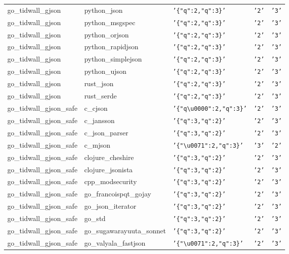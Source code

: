 \documentclass[english, 12pt, a4paper, sci, utf8, a-2b, online]{aaltothesis}
\def\str#1{\texttt{'#1'}}
\begin{document}
\begin{longtable}{lllll}
    go\_tidwall\_gjson & python\_json & \str{\{"q":2,"q":3\}} & \str{2} & \str{3} \\
    go\_tidwall\_gjson & python\_msgspec & \str{\{"q":2,"q":3\}} & \str{2} & \str{3} \\
    go\_tidwall\_gjson & python\_orjson & \str{\{"q":2,"q":3\}} & \str{2} & \str{3} \\
    go\_tidwall\_gjson & python\_rapidjson & \str{\{"q":2,"q":3\}} & \str{2} & \str{3} \\
    go\_tidwall\_gjson & python\_simplejson & \str{\{"q":2,"q":3\}} & \str{2} & \str{3} \\
    go\_tidwall\_gjson & python\_ujson & \str{\{"q":2,"q":3\}} & \str{2} & \str{3} \\
    go\_tidwall\_gjson & rust\_json & \str{\{"q":2,"q":3\}} & \str{2} & \str{3} \\
    go\_tidwall\_gjson & rust\_serde & \str{\{"q":2,"q":3\}} & \str{2} & \str{3} \\
    go\_tidwall\_gjson\_safe & c\_cjson & \str{\{"q\textbackslash u0000":2,"q":3\}} & \str{2} & \str{3} \\
    go\_tidwall\_gjson\_safe & c\_jansson & \str{\{"q":3,"q":2\}} & \str{2} & \str{3} \\
    go\_tidwall\_gjson\_safe & c\_json\_parser & \str{\{"q":3,"q":2\}} & \str{2} & \str{3} \\
    go\_tidwall\_gjson\_safe & c\_mjson & \str{\{"\textbackslash u0071":2,"q":3\}} & \str{3} & \str{2} \\
    go\_tidwall\_gjson\_safe & clojure\_cheshire & \str{\{"q":3,"q":2\}} & \str{2} & \str{3} \\
    go\_tidwall\_gjson\_safe & clojure\_jsonista & \str{\{"q":3,"q":2\}} & \str{2} & \str{3} \\
    go\_tidwall\_gjson\_safe & cpp\_modsecurity & \str{\{"q":3,"q":2\}} & \str{2} & \str{3} \\
    go\_tidwall\_gjson\_safe & go\_francoispqt\_gojay & \str{\{"q":3,"q":2\}} & \str{2} & \str{3} \\
    go\_tidwall\_gjson\_safe & go\_json\_iterator & \str{\{"q":3,"q":2\}} & \str{2} & \str{3} \\
    go\_tidwall\_gjson\_safe & go\_std & \str{\{"q":3,"q":2\}} & \str{2} & \str{3} \\
    go\_tidwall\_gjson\_safe & go\_sugawarayuuta\_sonnet & \str{\{"q":3,"q":2\}} & \str{2} & \str{3} \\
    go\_tidwall\_gjson\_safe & go\_valyala\_fastjson & \str{\{"\textbackslash u0071":2,"q":3\}} & \str{2} & \str{3} \\

\end{longtable}
\end{document}
